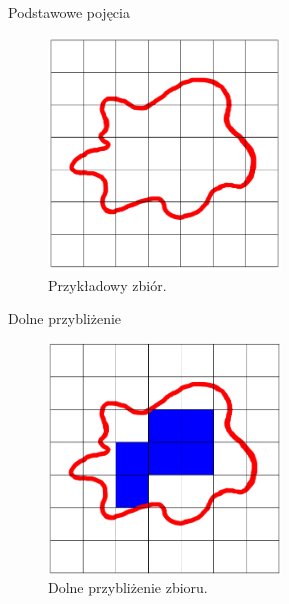 \documentclass[10pt]{beamer}
\begin{document}
\begin{frame}{Podstawowe pojęcia}
\begin{center}
\begin{figure}
\includegraphics[width=0.55\textwidth]{Grafiki/plama.png}
\caption{Przykładowy zbiór.}
\end{figure}
\end{center}
\end{frame}


\begin{frame}{Dolne przybliżenie}
\begin{center}
\begin{figure}
\includegraphics[width=0.55\textwidth]{Grafiki/dolne_przyblizenie.png}
\caption{Dolne przybliżenie zbioru.}
\end{figure}

\end{center}
\end{frame}
\end{document}
